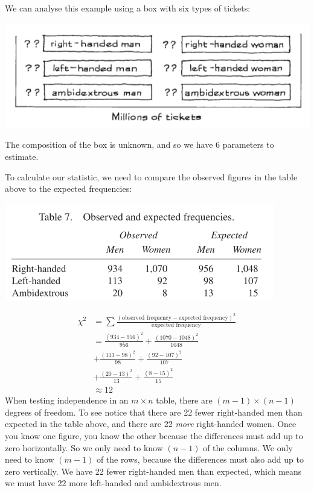 \documentclass[
]{book}
\begin{document}
We can analyse this example using a box with six types of tickets:

\includegraphics{images/Ch28Img04.png}

The composition of the box is unknown, and so we have 6 parameters to estimate.

To calculate our statistic, we need to compare the observed figures in the table above to the expected frequencies:

\includegraphics{images/Ch28Img05.png}

\[
\begin{aligned}
\chi^2 &= \sum\frac{(\text{observed frequency} - \text{expected frequency})^2}{\text{expected frequency}}\\
&= \frac{(934-956)^2}{956} + \frac{(1070-1048)^2}{1048} \\
&+ \frac{(113-98)^2}{98} +\frac{(92-107)^2}{107} \\
&+ \frac{(20-13)^2}{13} +\frac{(8-15)^2}{15} \\
&\approx 12
\end{aligned}
\]
When testing independence in an \(m \times n\) table, there are \((m-1) \times (n-1)\) degrees of freedom. To see notice that there are 22 fewer right-handed men than expected in the table above, and there are 22 \emph{more} right-handed women. Once you know one figure, you know the other because the differences must add up to zero horizontally. So we only need to know \((n-1)\) of the columns. We only need to know \((m-1)\) of the rows, because the differences must also add up to zero vertically. We have 22 fewer right-handed men than expected, which means we must have 22 more left-handed and ambidextrous men.
\end{document}
